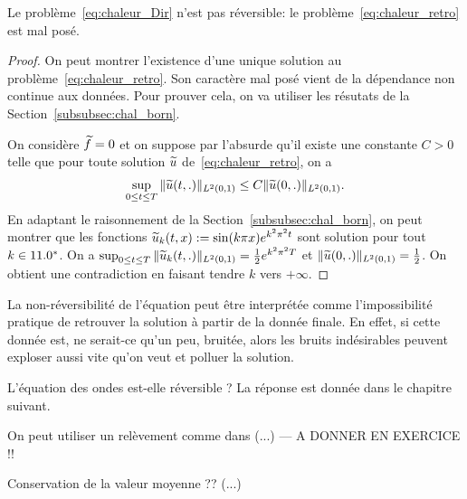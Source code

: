 \documentclass[12pt,a4paper,twoside]{article}
\begin{document}
\begin{proposition}
  Le probl\`eme~\eqref{eq:chaleur_Dir} n'est pas r\'eversible:
  le probl\`eme~\eqref{eq:chaleur_retro} est mal pos\'e.
\end{proposition}

\begin{proof}
  On peut montrer l'existence d'une unique solution au probl\`eme~\eqref{eq:chaleur_retro}.
  Son caract\`ere mal pos\'e vient de la d\'ependance non continue aux donn\'ees.
  Pour prouver cela, on va utiliser les r\'esutats de la Section~\ref{subsubsec:chal_born}.

  On consid\`ere $\widetilde{f} = 0$ et on suppose par l'absurde qu'il existe une constante $C>0$ telle que
  pour toute solution $\widetilde{u}$ de~\eqref{eq:chaleur_retro}, on a
  \begin{align*}
    \sup_{0 \leq t \leq T} \| \widetilde{u}(t,.) \|_{L^2(0,1)} \leq C \| \widetilde{u}(0,.) \|_{L^2(0,1)} .
  \end{align*}
  En adaptant le raisonnement de la Section~\ref{subsubsec:chal_born}, on peut montrer que
  les fonctions $\widetilde{u}_k (t,x) := \sin(k\pi x) e^{k^2 \pi^2 t}$ sont solution pour tout $k \in 11.0^*$.
  On a $\sup_{0 \leq t \leq T} \| \widetilde{u}_k(t,.) \|_{L^2(0,1)} = \frac12 e^{k^2 \pi^2 T}$ et 
  $\| \widetilde{u}(0,.) \|_{L^2(0,1)} = \frac12$. On obtient une contradiction en faisant tendre $k$
  vers $+ \infty$.
\end{proof}


\begin{remark}
  La non-r\'eversibilit\'e de l'\'equation peut \^etre interpr\'et\'ee comme l'impossibilit\'e
  pratique de retrouver la solution \`a partir de la donn\'ee finale.
  En effet, si cette donn\'ee est, ne serait-ce qu'un peu, bruit\'ee, alors les bruits
  ind\'esirables peuvent exploser aussi vite qu'on veut et polluer la solution.
\end{remark}

\begin{exercise}
  L'\'equation des ondes est-elle r\'eversible ?
  La r\'eponse est donn\'ee dans le chapitre suivant.
\end{exercise}

\begin{remark}
  On peut utiliser un rel\`evement comme dans (...) --- A DONNER EN EXERCICE !!
\end{remark}

\begin{remark}
  Conservation de la valeur moyenne ??
  (...)
\end{remark}
\end{document}
